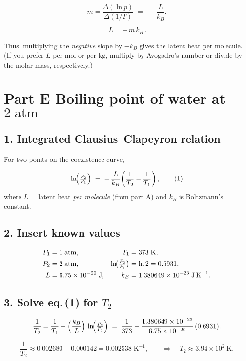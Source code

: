 \documentclass[12pt]{article}
\theoremstyle{definition} %
\theoremstyle{plain} %
\begin{document}
\[
  m = \frac{\Delta(\ln p)}{\Delta(1/T)} \;=\; -\,\frac{L}{k_B}.
\]

\[
  \boxed{\,L = -\,m\,k_B\,}.
\]

\noindent
Thus, multiplying the \emph{negative} slope by \(-k_B\) gives the latent heat per molecule.  
(If you prefer \(L\) per \(\mathrm{mol}\) or per \(\mathrm{kg}\), multiply by Avogadro’s number or divide by the molar mass, respectively.)
\section*{Part E Boiling point of water at \(2\;\text{atm}\)}

\subsection*{1.  Integrated Clausius–Clapeyron relation}

For two points on the coexistence curve,

\[
  \ln\!\Bigl(\tfrac{P_2}{P_1}\Bigr)
  \;=\;
  -\,\frac{L}{k_B}
  \!\left(
     \frac{1}{T_2} - \frac{1}{T_1}
  \right),
  \tag{1}
\]
where  
\(L\) = latent heat \emph{per molecule} (from part A)  
and \(k_B\) is Boltzmann’s constant.

\subsection*{2.  Insert known values}

\[
  \begin{aligned}
    P_1 &= 1\;\text{atm}, & T_1 &= 373\;\text{K},\\
    P_2 &= 2\;\text{atm}, & \ln\!\bigl(\tfrac{P_2}{P_1}\bigr) &= \ln 2 = 0.6931,\\
    L   &= 6.75\times10^{-20}\;\text{J}, &
    k_B &= 1.380649\times10^{-23}\;\text{J\,K}^{-1}.
  \end{aligned}
\]

\subsection*{3.  Solve eq.\,(1) for \(T_2\)}

\[
  \frac{1}{T_2}
  = \frac{1}{T_1}
    -\Bigl(\frac{k_B}{L}\Bigr)\,
     \ln\!\Bigl(\tfrac{P_2}{P_1}\Bigr)
  \;=\;
  \frac{1}{373}
  -\frac{1.380649\times10^{-23}}{6.75\times10^{-20}}\,
   (0.6931).
\]

\[
  \frac{1}{T_2}
  \approx 0.002680
          - 0.000142
  = 0.002538\;\text{K}^{-1},
  \qquad
  \Longrightarrow\quad
  T_2 \approx 3.94\times10^{2}\;\text{K}.
\]
\end{document}
